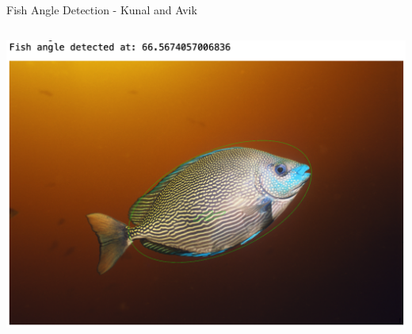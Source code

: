 \begin{frame}{Fish Angle Detection - Kunal and Avik}
\begin{columns}
\begin{column}{0.5\textwidth}
            \includegraphics[height=1\textheight,width=1\textwidth,keepaspectratio]{fish_angle.png}
        \end{column}
    \end{columns}
\end{frame}